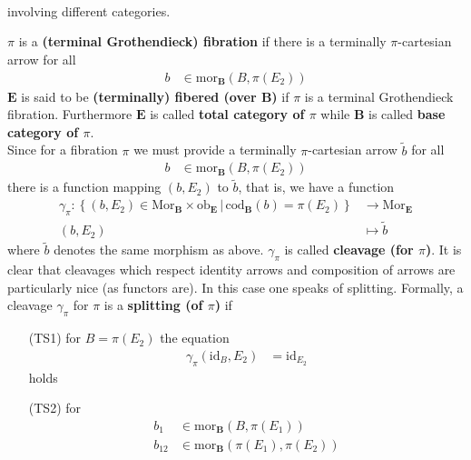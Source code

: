 \begin{enumerate}
\begin{enumerate}
\[\begin{tikzcd}[sep=large]
\end{tikzcd}
\]
involving different categories.
\end{enumerate}
$\pi$ is a \textbf{(terminal Grothendieck) fibration} if there is a terminally $\pi$-cartesian arrow for all
\begin{align*}
  b
  &\in
  \mathrm{mor}_{\mathbf{B}}
  \left(
    B,
    \pi(E_{2})
  \right)
\end{align*}
$\mathbf{E}$ is said to be \textbf{(terminally) fibered (over $\mathbf{B}$)} if $\pi$ is a terminal Grothendieck fibration. Furthermore $\mathbf{E}$ is called \textbf{total category of $\pi$} while $\mathbf{B}$ is called \textbf{base category of $\pi$}.
\\
Since for a fibration $\pi$ we must provide a terminally $\pi$-cartesian arrow $\tilde{b}$ for all
\begin{align*}
  b
  &\in
  \mathrm{mor}_{\mathbf{B}}
  \left(
    B,
    \pi(E_{2})
  \right)
\end{align*}
there is a function mapping $(b,E_{2})$ to $\tilde{b}$, that is, we have a function
\begin{align*}
  \gamma_{\pi}
  \colon
  \left\lbrace
      (b,E_{2})
      \in
      \mathrm{Mor}_{\mathbf{B}}
      \times
      \mathrm{ob}_{\mathbf{E}}
    \,
    \vert
    \,
      \mathrm{cod}_{\mathbf{B}}(b)
      =
      \pi(E_{2})
  \right\rbrace
  &\rightarrow
  \mathrm{Mor}_{\mathbf{E}}
  \\
  (b,E_{2})
  &\mapsto
  \tilde{b}
\end{align*}
where $\tilde{b}$ denotes the same morphism as above. $\gamma_{\pi}$ is called \textbf{cleavage (for $\pi$)}. It is clear that cleavages which respect identity arrows and composition of arrows are particularly nice (as functors are). In this case one speaks of splitting. Formally, a cleavage $\gamma_{\pi}$ for $\pi$ is a \textbf{splitting (of $\pi$)} if
\begin{enumerate}
\item[(TS1)]
for $B = \pi(E_{2})$ the equation
\begin{align*}
  \gamma_{\pi}(\mathrm{id}_{B},E_{2})
  &=
  \mathrm{id}_{E_{2}}
\end{align*}
holds
\item[(TS2)]
for
\begin{align*}
  b_{1}
  &\in
  \mathrm{mor}_{\mathbf{B}}
  \left(
    B,
    \pi(E_{1})
  \right)
  \\
  b_{12}
  &\in
  \mathrm{mor}_{\mathbf{B}}
  \left(
    \pi(E_{1}),
    \pi(E_{2})
  \right)
\end{align*}

\end{enumerate}
\end{enumerate}
